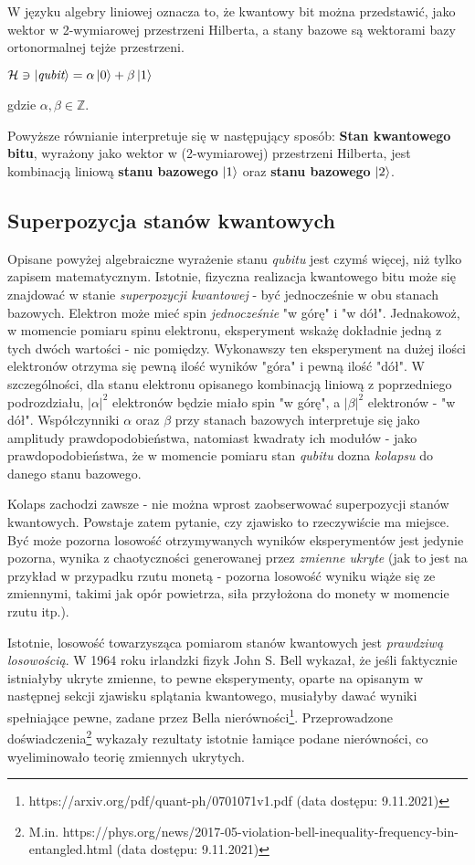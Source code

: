 \documentclass[12pt,a4paper,twoside,openany]{book}
\begin{document}
W języku algebry liniowej oznacza to, że kwantowy bit można przedstawić, jako wektor w 2-wymiarowej przestrzeni Hilberta, a stany bazowe są wektorami bazy ortonormalnej tejże przestrzeni.
\begin{center}
    $\mathcal{H} \ni \ket{\textit{qubit}} = \alpha\ket{0} + \beta\ket{1}$
\end{center}
gdzie $\alpha, \beta \in \mathbb{Z}$.

Powyższe równianie interpretuje się w następujący sposób: \textbf{Stan kwantowego bitu}, wyrażony jako wektor w (2-wymiarowej) przestrzeni Hilberta, jest kombinacją liniową \textbf{stanu bazowego} $\ket{1}$ oraz \textbf{stanu bazowego} $\ket{2}$.

\subsection{Superpozycja stanów kwantowych}

Opisane powyżej algebraiczne wyrażenie stanu \textit{qubitu} jest czymś więcej, niż tylko zapisem matematycznym. Istotnie, fizyczna realizacja kwantowego bitu może się znajdować w stanie \textit{superpozycji kwantowej} - być jednocześnie w obu stanach bazowych. Elektron może mieć spin \textit{jednocześnie} "w górę" i "w dół". Jednakowoż, w momencie pomiaru spinu elektronu, eksperyment wskażę dokładnie jedną z tych dwóch wartości - nic pomiędzy. Wykonawszy ten eksperyment na dużej ilości elektronów otrzyma się pewną ilość wyników "góra" i pewną ilość "dół". W szczególności, dla stanu elektronu opisanego kombinacją liniową z poprzedniego podrozdziału, $|\alpha|^2$ elektronów będzie miało spin "w górę", a $|\beta|^2$ elektronów - "w dół". Współczynniki $\alpha$ oraz $\beta$ przy stanach bazowych interpretuje się jako amplitudy prawdopodobieństwa, natomiast kwadraty ich modułów - jako prawdopodobieństwa, że w momencie pomiaru stan \textit{qubitu} dozna \textit{kolapsu} do danego stanu bazowego.

Kolaps zachodzi zawsze - nie można wprost zaobserwować superpozycji stanów kwantowych. Powstaje zatem pytanie, czy zjawisko to rzeczywiście ma miejsce. Być może pozorna losowość otrzymywanych wyników eksperymentów jest jedynie pozorna, wynika z chaotyczności generowanej przez \textit{zmienne ukryte} (jak to jest na przykład w przypadku rzutu monetą - pozorna losowość wyniku wiąże się ze zmiennymi, takimi jak opór powietrza, siła przyłożona do monety w momencie rzutu itp.). 

Istotnie, losowość towarzysząca pomiarom stanów kwantowych jest \textit{prawdziwą losowością}. W 1964 roku irlandzki fizyk John S. Bell wykazał, że jeśli faktycznie istniałyby ukryte zmienne, to pewne eksperymenty, oparte na opisanym w następnej sekcji zjawisku splątania kwantowego, musiałyby dawać wyniki spełniające pewne, zadane przez Bella nierówności\footnote{https://arxiv.org/pdf/quant-ph/0701071v1.pdf (data dostępu: 9.11.2021)}. Przeprowadzone doświadczenia\footnote{M.in. https://phys.org/news/2017-05-violation-bell-inequality-frequency-bin-entangled.html (data dostępu: 9.11.2021)} wykazały rezultaty istotnie łamiące podane nierówności, co wyeliminowało teorię zmiennych ukrytych.
\end{document}
